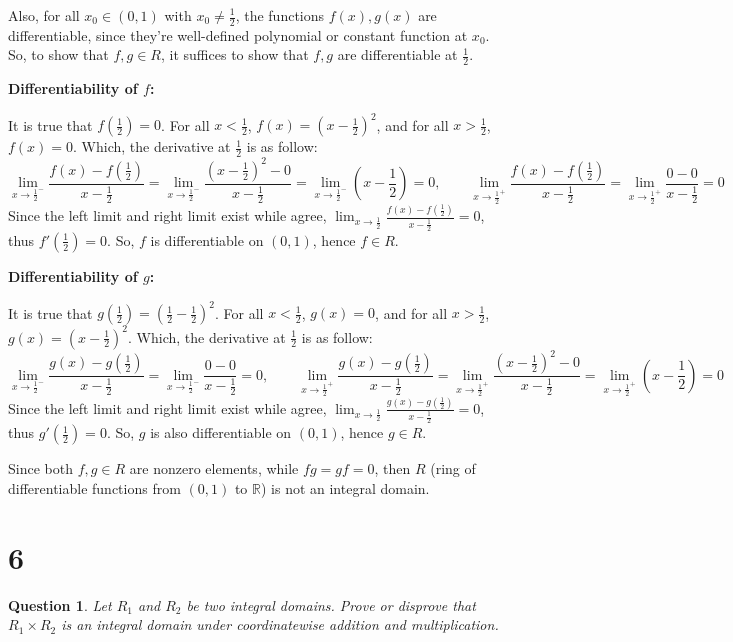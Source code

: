 \documentclass{article}
\newtheorem{question}{Question}
\begin{document}
Also, for all $x_0\in (0,1)$ with $x_0\neq \frac{1}{2}$, the functions $f(x),g(x)$ are differentiable, 
since they're well-defined polynomial or constant function at $x_0$. So, to show that $f,g\in R$, 
it suffices to show that $f,g$ are differentiable at $\frac{1}{2}$.

\hfill

\textbf{Differentiability of $f$:}

It is true that $f(\frac{1}{2})=0$. For all $x<\frac{1}{2}$, $f(x)=(x-\frac{1}{2})^2$, and for all $x>\frac{1}{2}$, $f(x)=0$.
Which, the derivative at $\frac{1}{2}$ is as follow:
$$\lim_{x\rightarrow\frac{1}{2}^-}\frac{f(x)-f(\frac{1}{2})}{x-\frac{1}{2}}=\lim_{x\rightarrow\frac{1}{2}^-}\frac{(x-\frac{1}{2})^2-0}{x-\frac{1}{2}}=\lim_{x\rightarrow\frac{1}{2}^-}(x-\frac{1}{2})=0,
\quad\quad \lim_{x\rightarrow\frac{1}{2}^+}\frac{f(x)-f(\frac{1}{2})}{x-\frac{1}{2}}=\lim_{x\rightarrow\frac{1}{2}^+}\frac{0-0}{x-\frac{1}{2}}=0$$
Since the left limit and right limit exist while agree, $\lim_{x\rightarrow\frac{1}{2}}\frac{f(x)-f(\frac{1}{2})}{x-\frac{1}{2}}=0$, thus $f'(\frac{1}{2})=0$.
So, $f$ is differentiable on $(0,1)$, hence $f\in R$.

\hfill

\textbf{Differentiability of $g$:}

It is true that $g(\frac{1}{2})=(\frac{1}{2}-\frac{1}{2})^2$. For all $x<\frac{1}{2}$, $g(x)=0$, and for all $x>\frac{1}{2}$, $g(x)=(x-\frac{1}{2})^2$.
Which, the derivative at $\frac{1}{2}$ is as follow:
$$\lim_{x\rightarrow\frac{1}{2}^-}\frac{g(x)-g(\frac{1}{2})}{x-\frac{1}{2}}=\lim_{x\rightarrow\frac{1}{2}^-}\frac{0-0}{x-\frac{1}{2}}=0
,\quad\quad \lim_{x\rightarrow\frac{1}{2}^+}\frac{g(x)-g(\frac{1}{2})}{x-\frac{1}{2}}=\lim_{x\rightarrow\frac{1}{2}^+}\frac{(x-\frac{1}{2})^2-0}{x-\frac{1}{2}}=\lim_{x\rightarrow\frac{1}{2}^+}(x-\frac{1}{2})=0$$
Since the left limit and right limit exist while agree, $\lim_{x\rightarrow\frac{1}{2}}\frac{g(x)-g(\frac{1}{2})}{x-\frac{1}{2}}=0$, thus $g'(\frac{1}{2})=0$.
So, $g$ is also differentiable on $(0,1)$, hence $g\in R$.

\hfill

Since both $f,g\in R$ are nonzero elements, while $fg=gf=0$, then $R$ (ring of differentiable functions from $(0,1)$ to $\mathbb{R}$) is not an integral domain.

\break

\section*{6}
\begin{myBox}[]{}
    \begin{question}
        Let $R_1$ and $R_2$ be two integral domains. Prove or disprove that $R_1\times R_2$ is an
        integral domain under coordinatewise addition and multiplication.
    \end{question}
\end{myBox}
\end{document}
